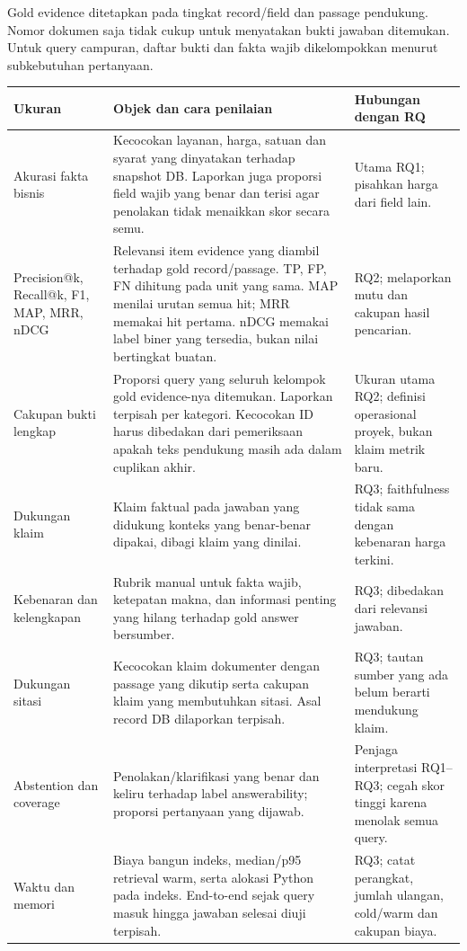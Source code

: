 \documentclass[11pt,a4paper]{article}
\newcommand{\rowcolor}[1]{}
\newcommand{\heading}[1]{\vspace{5pt}{\large\bfseries #1}\par\vspace{1pt}}
\begin{document}
\clearpage
\heading{Definisi Parameter Uji}
Gold evidence ditetapkan pada tingkat record/field dan passage pendukung. Nomor dokumen saja tidak cukup untuk menyatakan bukti jawaban ditemukan. Untuk query campuran, daftar bukti dan fakta wajib dikelompokkan menurut subkebutuhan pertanyaan.

{\small
\begin{tabularx}{\linewidth}{|L{2.7cm}|X|L{4.0cm}|}
\hline
\rowcolor{headfill}\textbf{Ukuran} & \textbf{Objek dan cara penilaian} & \textbf{Hubungan dengan RQ}\\\hline
Akurasi fakta bisnis & Kecocokan layanan, harga, satuan dan syarat yang dinyatakan terhadap snapshot DB. Laporkan juga proporsi field wajib yang benar dan terisi agar penolakan tidak menaikkan skor secara semu. & Utama RQ1; pisahkan harga dari field lain.\\\hline
Precision@k, Recall@k, F1, MAP, MRR, nDCG & Relevansi item evidence yang diambil terhadap gold record/passage. TP, FP, FN dihitung pada unit yang sama. MAP menilai urutan semua hit; MRR memakai hit pertama. nDCG memakai label biner yang tersedia, bukan nilai bertingkat buatan. & RQ2; melaporkan mutu dan cakupan hasil pencarian.\\\hline
Cakupan bukti lengkap & Proporsi query yang seluruh kelompok gold evidence-nya ditemukan. Laporkan terpisah per kategori. Kecocokan ID harus dibedakan dari pemeriksaan apakah teks pendukung masih ada dalam cuplikan akhir. & Ukuran utama RQ2; definisi operasional proyek, bukan klaim metrik baru.\\\hline
Dukungan klaim & Klaim faktual pada jawaban yang didukung konteks yang benar-benar dipakai, dibagi klaim yang dinilai. & RQ3; faithfulness tidak sama dengan kebenaran harga terkini.\\\hline
Kebenaran dan kelengkapan & Rubrik manual untuk fakta wajib, ketepatan makna, dan informasi penting yang hilang terhadap gold answer bersumber. & RQ3; dibedakan dari relevansi jawaban.\\\hline
Dukungan sitasi & Kecocokan klaim dokumenter dengan passage yang dikutip serta cakupan klaim yang membutuhkan sitasi. Asal record DB dilaporkan terpisah. & RQ3; tautan sumber yang ada belum berarti mendukung klaim.\\\hline
Abstention dan coverage & Penolakan/klarifikasi yang benar dan keliru terhadap label answerability; proporsi pertanyaan yang dijawab. & Penjaga interpretasi RQ1--RQ3; cegah skor tinggi karena menolak semua query.\\\hline
Waktu dan memori & Biaya bangun indeks, median/p95 retrieval warm, serta alokasi Python pada indeks. End-to-end sejak query masuk hingga jawaban selesai diuji terpisah. & RQ3; catat perangkat, jumlah ulangan, cold/warm dan cakupan biaya.\\\hline
\end{tabularx}}
\end{document}
